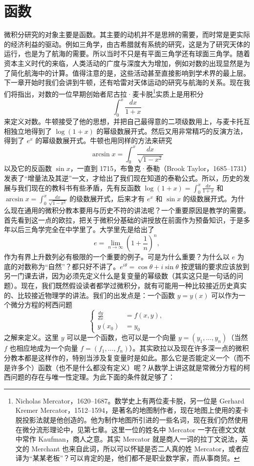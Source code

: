 \chapter{函数}

微积分研究的对象主要是函数。其主要的动机并不是思辨的需要，而时常是更实际的经济利益的驱动。例如三角学，由古希腊就有系统的研究，这是为了研究天体的运行，也是为了航海的需要。所以当时不只是有平面三角学还有球面三角学。随着资本主义时代的来临，人类活动的广度与深度大为增加，例如对数的出现显然是为了简化航海中的计算。值得注意的是，这些活动甚至直接影响到学术界的最上层。下一章开始时我们会讲到牛顿，还有哈雷对天体运动的研究与航海的关系。现在我们将指出，对数的一位早期创始者尼古拉·麦卡脱\footnote{Nicholas Mercator，1620--1687。数学史上有两位麦卡脱，另一位是 Gerhard Kremer Mercator，1512--1594，是著名的地图制作者，现在地图上使用的麦卡脱投影法就是他创造的。他为制作地图所引进的一些名词，现在我们仍然使用在微分流形理论中，见第七章。这里一位的姓名中 Mercator 一字在德文文献中常作 Kaufman，商人之意。其实 Mercator 就是商人一词的拉丁文说法，英文的 Merchant 也来自此词，所以可以怀疑是否二人真的姓 Mercator，或者应译为“某某老板”？可以肯定的是，他们都不是职业数学家，而从事商贸。}实质上是用积分
\[
\int_0^x\frac{dx}{1+x}
\]
来定义对数。牛顿接受了他的思想，并把自己最得意的二项级数用上，与麦卡托互相独立地得到了 $\log(1+x)$ 的幂级数展开式。然后又用非常精巧的反演方法，得到了 $e^x$ 的幂级数展开式。牛顿也用同样的方法来研究
\[
\arcsin x=\int_0^x\frac{dx}{\sqrt{1-x^2}}
\]
以及它的反函数 $\sin x$，一直到 1715，布鲁克·泰勒（Brook Taylor，1685--1731）发表了“增量法及其逆”一文，才给出了我们现在知道的泰勒公式。所以，历史的发展与我们现在的教科书有些矛盾，先有反函数 $\log(1+x)=\int_0^x\frac{dx}{1+x}$ 和 $\arcsin x=\int_0^x\frac{dx}{\sqrt{1-x^2}}$ 的级数展开式，后来才有 $e^x$ 和 $\sin x$ 的级数展开式。为什么现在通用的微积分教本要用与历史不符的讲法呢？一个重要原因是教学的需要。首先看到这一点的欧拉，把关于微积分基础的讲授放在前面作为预备知识，于是多年以后三角学完全在中学里了。大学里先是给出了
\[
e=\lim_{n\to\infty}\left(1+\frac1n\right)^n,
\]
作为有界上升数列必有极限的一个重要的例子。可是为什么重要？为什么以 $e$ 为底的对数称为“自然”？都只好不讲了。$e^{i\theta}=\cos\theta+i\sin\theta$ 按逻辑的要求应该放到另一门课去讲，因为必须先定义什么是复变量的幂级数（其实这只是一句话的问题）。现在，我们既然假设读者都学过微积分，就有可能用一种比较接近历史真实的、比较接近物理学的讲法。我们的出发点是：一个函数 $y=y(x)$ 可以作为一个微分方程的柯西问题
\[
\left\{
\begin{aligned}
\frac{dy}{dx}&=f(x,y),\\
y(x_0)&=y_0
\end{aligned}
\right. \tag{A}
\]
之解来定义。这里 $y$ 可以是一个函数，也可以是一个向量 $y=(y_1,\ldots,y_n)$（当然 $f$ 也相应地成为一个向量 $f=(f_1,\ldots,f_n)$）。其实欧拉以及现在许多深一点的微积分教本都是这样作的，特别当涉及复变量时是如此。那么它是否能定义一个（而不是许多个）函数（也不是什么都没有定义）呢？从数学上讲这就是常微分方程的柯西问题的存在与唯一性定理。为此下面的条件就足够了：

